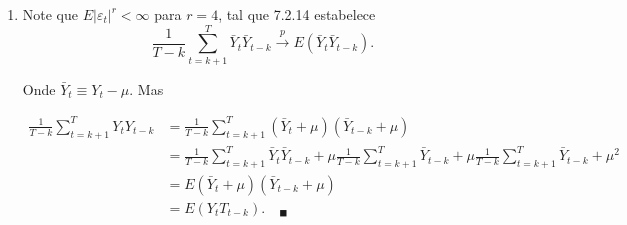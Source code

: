 \begin{enumerate}
\begin{enumerate}
	 	\item %
	 	
	 	Note que  $E|\varepsilon_t|^r<\infty$ para $r=4$, tal que 7.2.14 estabelece $$\frac{1}{T-k}\sum\limits_{t=k+1}^T\bar{Y}_t\bar{Y}_{t-k}\xrightarrow[]{p}E(\bar{Y}_t\bar{Y}_{t-k}).$$
	 	
	 	Onde $\bar{Y}_t\equiv Y_t-\mu$. Mas
	 	
	 	\begin{align*}
	 		\frac{1}{T-k}\sum\limits_{t=k+1}^TY_tY_{t-k}&=\frac{1}{T-k}\sum\limits_{t=k+1}^T(\bar{Y}_t+\mu)(\bar{Y}_{t-k}+\mu)\\
	 		&=\frac{1}{T-k}\sum\limits_{t=k+1}^T\bar{Y}_t\bar{Y}_{t-k}+\mu\frac{1}{T-k}\sum\limits_{t=k+1}^T\bar{Y}_{t-k}+\mu\frac{1}{T-k}\sum\limits_{t=k+1}^T\bar{Y}_{t-k}+\mu^2\\
	 		&=E(\bar{Y}_t+\mu)(\bar{Y}_{t-k}+\mu)\\
	 		&=E(Y_tT_{t-k}).\quad_{\blacksquare}
	 	\end{align*}
	 \end{enumerate}
	 	 
\end{enumerate}